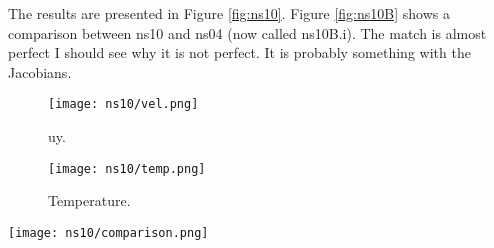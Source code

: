 \documentclass[11pt,letterpaper]{article}
\begin{document}
The results are presented in Figure \ref{fig:ns10}. Figure \ref{fig:ns10B} shows a comparison between ns10 and ns04 (now called ns10B.i). The match is almost perfect I should see why it is not perfect. It is probably something with the Jacobians.

\begin{figure*}[!h]
	\centering
	\begin{subfigure}[t]{0.4\textwidth}
		\centering
		\texttt{[image: ns10/vel.png]} 
		\caption{uy.}
		\label{fig:ns10-vel}
	\end{subfigure}
	\vspace{1cm}
	\begin{subfigure}[t]{0.4\textwidth}
		\centering
		\texttt{[image: ns10/temp.png]}
		\caption{Temperature.}
		\label{fig:ns10-temp}
	\end{subfigure}
	\hfill
	\caption{Temperature.}
	\label{fig:ns10}
\end{figure*}

\begin{figure*}[!h]
	\centering
	\texttt{[image: ns10/comparison.png]} 
	\hfill
	\caption{Comparison between INS and my model.}
	\label{fig:ns10B}
\end{figure*}



\pagebreak 


\end{document}
